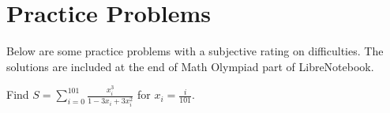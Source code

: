 \documentclass[../../../main.tex]{subfiles}
\begin{document}
\section{Practice Problems}

Below are some practice problems with a subjective rating on
difficulties. The solutions are included at the end of Math Olympiad
part of LibreNotebook.

\begin{listproblem}
Find $S = \sum_{i=0}^{101} \frac{x_i^3}{1 - 3x_i + 3x_i^2}$ for
$x_i = \frac{i}{101}$.
\end{listproblem}
\end{document}
